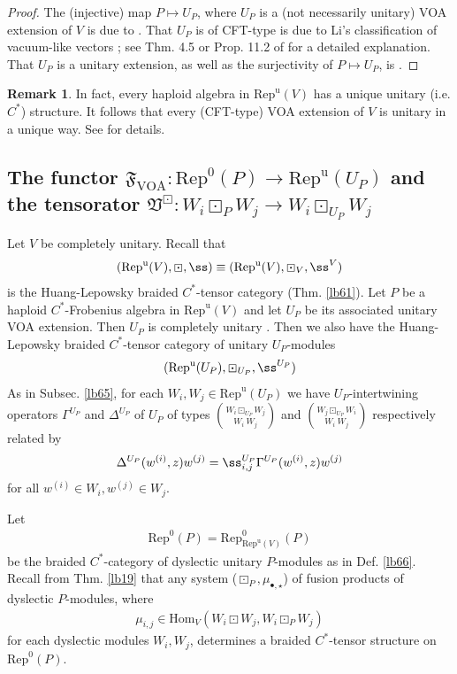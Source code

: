 \documentclass[11pt,b5paper,notitlepage]{article}
\theoremstyle{definition}
\newtheorem{rem}[df]{Remark}
\theoremstyle{plain}
\newcommand{\fk}{\mathfrak}
\newcommand{\Hom}{\mathrm{Hom}}
\newcommand{\Rep}{\mathrm{Rep}}
\newcommand{\uni}{\mathrm{u}}
\newcommand{\RepV}{{\mathrm{Rep}^\uni(V)}}
\newcommand{\blt}{\bullet}
\newcommand{\VOA}{{\scriptscriptstyle \mathrm{VOA}}}
\newcommand{\RepUP}{\mathrm{Rep}^{\mathrm u}(U_P)}
\numberwithin{equation}{section}
\begin{document}
\begin{proof}
The (injective) map $P\mapsto U_P$, where $U_P$ is a (not necessarily unitary) VOA extension of $V$ is due to \cite[Thm. 3.2]{HKL15}. That $U_P$ is of CFT-type is due to Li's classification of vacuum-like vectors \cite[Prop. 3.4]{Li94}; see Thm. 4.5 or Prop. 11.2 of \cite{Gui24} for a detailed explanation. That $U_P$ is a unitary extension, as well as the surjectivity of $P\mapsto U_P$, is \cite[Thm. 2.21]{Gui22}.
\end{proof}


\begin{rem}
In fact, every haploid algebra in $\RepV$ has a unique unitary (i.e. $C^*$) structure. It follows that every (CFT-type) VOA extension of $V$ is unitary  in a unique way.  See \cite[Thm. 4.7]{CGGH23} for details.
\end{rem}






\subsection{The functor $\fk F_\VOA:\Rep^0(P)\rightarrow\RepUP$ and the tensorator $\fk V^\boxdot:W_i\boxdot_P W_j\rightarrow W_i\boxdot_{U_P}W_j$}\label{lb108}



Let $V$ be completely unitary. Recall that
\begin{align*}
(\RepV,\boxdot,\ss)\equiv(\RepV,\boxdot_V,\ss^V)
\end{align*}
is the Huang-Lepowsky braided $C^*$-tensor category (Thm. \ref{lb61}). Let $P$ be a haploid $C^*$-Frobenius algebra in $\RepV$ and let $U_P$ be its associated unitary VOA extension. Then $U_P$ is completely unitary \cite[Thm. 3.30]{Gui22}. Then we also have the Huang-Lepowsky braided $C^*$-tensor category of unitary $U_P$-modules
\begin{align}
(\RepUP,\boxdot_{U_P},\ss^{U_P})
\end{align}
As in Subsec. \ref{lb65}, for each $W_i,W_j\in\RepUP$ we have $U_P$-intertwining operators $\Gamma^{U_P}$ and $\Delta^{U_P}$ of $U_P$ of types $W_i\boxdot_{U_P} W_j\choose W_i~W_j$ and $W_j\boxdot_{U_P} W_i\choose W_i~W_j$ respectively related by
\begin{align*}
\Delta^{U_P}(w^{(i)},z)w^{(j)}=\ss_{i,j}^{U_P}\Gamma^{U_P}(w^{(i)},z)w^{(j)}
\end{align*}
for all $w^{(i)}\in W_i,w^{(j)}\in W_j$. 

Let
\begin{align*}
\Rep^0(P)=\Rep^0_{\RepV}(P)
\end{align*}
be the braided $C^*$-category of dyslectic unitary $P$-modules as in Def. \ref{lb66}. Recall from Thm. \ref{lb19} that any system ($\boxdot_P,\mu_{\blt,\star}$) of fusion products of dyslectic $P$-modules, where
\begin{align*}
\mu_{i,j}\in\Hom_V(W_i\boxdot W_j,W_i\boxdot_PW_j)
\end{align*}
for each dyslectic modules $W_i,W_j$, determines a braided $C^*$-tensor structure on $\Rep^0(P)$.
\end{document}
